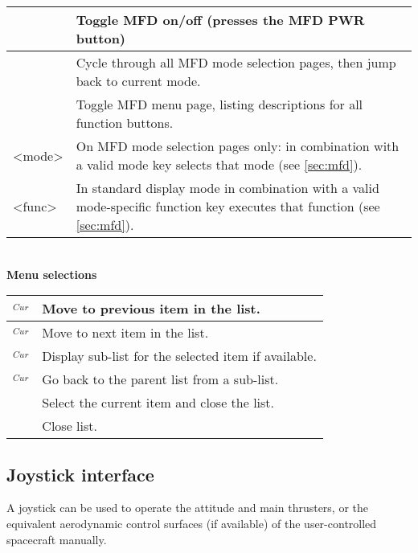 \documentclass[Orbiter User Manual.tex]{subfiles}
\begin{document}
	\begin{longtable}{ |p{}|p{}| }
	\hline\rule{0pt}{2ex}
	\Shift\keystroke{Esc} & Toggle MFD on/off (presses the MFD PWR button)\\
	\hline\rule{0pt}{2ex}
	\Shift\keystroke{F1} & Cycle through all MFD mode selection pages, then jump back to current mode.\\
	\hline\rule{0pt}{2ex}
	\Shift\keystroke{'} & Toggle MFD menu page, listing descriptions for all function buttons.\\
	\hline\rule{0pt}{2ex}
	\Shift<mode> & On MFD mode selection pages only: \Shift in combination with a valid mode key selects that mode (see \ref{sec:mfd}).\\
	\hline\rule{0pt}{2ex}
	\Shift<func> & In standard display mode \Shift in combination with a valid mode-specific function key executes that function (see \ref{sec:mfd}).\\
	\hline
	\end{longtable}

\noindent
\\
\textbf{Menu selections}

	\begin{longtable}{ |p{}|p{}| }
	\hline\rule{0pt}{2ex}
	\UArrow$_{Cur}$ & Move to previous item in the list.\\
	\hline\rule{0pt}{2ex}
	\DArrow$_{Cur}$ & Move to next item in the list.\\
	\hline\rule{0pt}{2ex}
	\RArrow$_{Cur}$ & Display sub-list for the selected item if available.\\
	\hline\rule{0pt}{2ex}
	\LArrow$_{Cur}$ & Go back to the parent list from a sub-list.\\
	\hline\rule{0pt}{2ex}
	\Enter & Select the current item and close the list.\\
	\hline\rule{0pt}{2ex}
	\keystroke{Esc} & Close list.\\
	\hline
	\end{longtable}


\subsection{Joystick interface}
A joystick can be used to operate the attitude and main thrusters, or the equivalent aerodynamic control surfaces (if available) of the user-controlled spacecraft manually.
\end{document}
